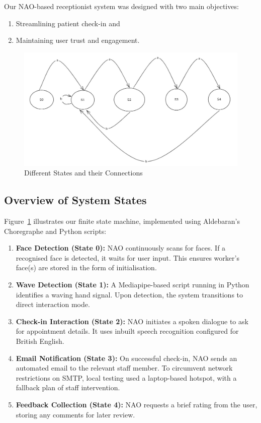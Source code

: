 \documentclass[conference]{IEEEtran}
\begin{document}
Our NAO-based receptionist system was designed with two main objectives:
\begin{enumerate}
        \item Streamlining patient check-in and
        \item Maintaining user trust and engagement.
\end{enumerate}

\begin{figure}
        \centering
        \includegraphics[width=.6\linewidth]{states.jpg}
        \caption{Different States and their Connections}
        \label{Different states}
\end{figure}

\subsection{Overview of System States} Figure~\ref{Different states} illustrates our finite state machine, implemented
using Aldebaran’s Choregraphe and Python scripts:

\begin{enumerate} \item \textbf{Face Detection (State 0):} NAO continuously scans for faces. If a recognised face is detected, it waits for user input. This ensures worker's face(s) are stored in the form of initialisation.
        \item \textbf{Wave Detection (State 1):} A Mediapipe-based script running in Python identifies a waving hand signal. Upon detection, the system transitions to direct interaction mode.
        \item \textbf{Check-in Interaction (State 2):} NAO initiates a spoken dialogue to ask for appointment details. It uses inbuilt speech recognition configured for British English.
        \item \textbf{Email Notification (State 3):} On successful check-in, NAO sends an automated email to the relevant staff member. To circumvent network restrictions on SMTP, local testing used a laptop-based hotspot, with a fallback plan of staff intervention.
        \item \textbf{Feedback Collection (State 4):} NAO requests a brief rating from the user, storing any comments for later review.
\end{enumerate}
\end{document}
